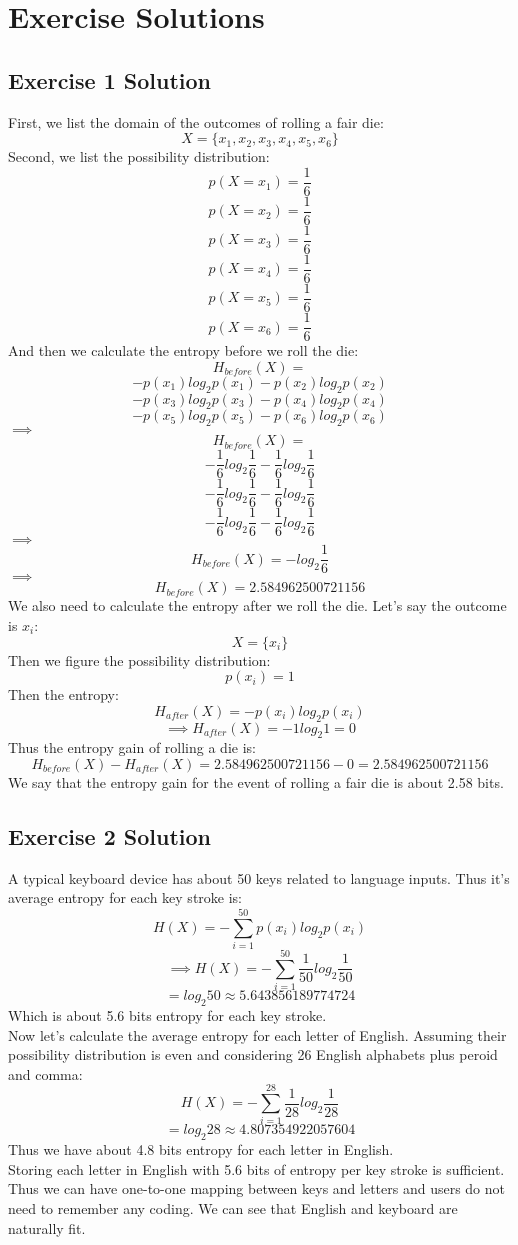 \documentclass[12pt]{article}
\begin{document}
\section{Exercise Solutions}

\subsection{Exercise 1 Solution}
First, we list the domain of the outcomes of rolling a fair die:
\[
	X = \{x_1, x_2, x_3, x_4, x_5, x_6\}
\]
Second, we list the possibility distribution:
\[
	p(X=x_1) = \frac{1}{6}
\]
\[
	p(X=x_2) = \frac{1}{6}
\]
\[
	p(X=x_3) = \frac{1}{6}
\]
\[
	p(X=x_4) = \frac{1}{6}
\]
\[
	p(X=x_5) = \frac{1}{6}
\]
\[
	p(X=x_6) = \frac{1}{6}
\]
And then we calculate the entropy before we roll the die:
\[
	H_{before}(X) = 
\]
\[
	-p(x_1)log_{2}p(x_1)  
	- p(x_2)log_{2}p(x_2)
\]
\[
	- p(x_3)log_{2}p(x_3)
	- p(x_4)log_{2}p(x_4)
\]
\[
	- p(x_5)log_{2}p(x_5)
	- p(x_6)log_{2}p(x_6)
\]
$\implies$
\[
	H_{before}(X) = 
\]
\[
	-\frac{1}{6}log_{2}\frac{1}{6}  
	-\frac{1}{6}log_{2}\frac{1}{6}  
\]
\[
	-\frac{1}{6}log_{2}\frac{1}{6}  
	-\frac{1}{6}log_{2}\frac{1}{6}  
\]
\[
	-\frac{1}{6}log_{2}\frac{1}{6}  
	-\frac{1}{6}log_{2}\frac{1}{6}  
\]
$\implies$
\[
	H_{before}(X) = 
	-log_{2}\frac{1}{6}  
\]
$\implies$
\[
	H_{before}(X) = 2.584962500721156 
\]
We also need to calculate the entropy after we roll the die.
Let's say the outcome is $x_i$:
\[
	X = \{x_i\}
\]
Then we figure the possibility distribution:
\[
	p(x_i) = 1
\]
Then the entropy:
\[
	H_{after}(X) = 
	-p(x_i)log_{2}p(x_i)  
\]
\[
\implies
	H_{after}(X) = 
	-1log_{2}1 = 0
\]  
Thus the entropy gain of rolling a die is:
\[
	H_{before}(X) - H_{after}(X) = 2.584962500721156 - 0 = 2.584962500721156
\]
We say that the entropy gain for the event of rolling a fair die is about 2.58 bits.

\subsection{Exercise 2 Solution}
A typical keyboard device has about 50 keys related to language inputs. Thus it's average entropy for each key stroke is:
\[
	H(X) = -\sum_{i=1}^{50}p(x_i)log_{2}p(x_i)
\]
\[
\implies
	H(X) = -\sum_{i=1}^{50}\frac{1}{50}log_{2}\frac{1}{50}
\]
\[
	= log_{2}50 \approx 5.643856189774724
\]
Which is about 5.6 bits entropy for each key stroke.\\
Now let's calculate the average entropy for each letter of English. Assuming their possibility distribution is even and considering 26 English alphabets plus peroid and comma:
\[
	H(X) = -\sum_{i=1}^{28}\frac{1}{28}log_{2}\frac{1}{28}
\]
\[
	= log_{2}28 \approx 4.807354922057604
\]
Thus we have about 4.8 bits entropy for each letter in English.\\
Storing each letter in English with 5.6 bits of entropy per key stroke is sufficient. Thus we can have one-to-one mapping between keys and letters and users do not need to remember any coding. We can see that English and keyboard are naturally fit.\\
\end{document}
